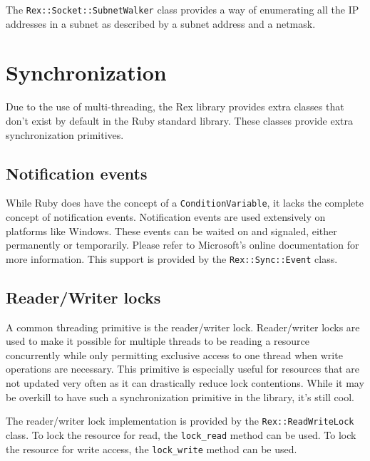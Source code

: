 \documentclass{report}
\begin{document}
\par
The \texttt{Rex::Socket::SubnetWalker} class provides a way of
enumerating all the IP addresses in a subnet as described by a
subnet address and a netmask.

    \section{Synchronization}

\par
Due to the use of multi-threading, the Rex library provides extra
classes that don't exist by default in the Ruby standard library.
These classes provide extra synchronization primitives.

        \subsection{Notification events}

\par
While Ruby does have the concept of a \texttt{ConditionVariable}, it
lacks the complete concept of notification events.  Notification
events are used extensively on platforms like Windows.  These events
can be waited on and signaled, either permanently or temporarily.
Please refer to Microsoft's online documentation for more
information. This support is provided by the
\texttt{Rex::Sync::Event} class.

        \subsection{Reader/Writer locks}

\par
A common threading primitive is the reader/writer lock.
Reader/writer locks are used to make it possible for multiple
threads to be reading a resource concurrently while only permitting
exclusive access to one thread when write operations are necessary.
This primitive is especially useful for resources that are not
updated very often as it can drastically reduce lock contentions.
While it may be overkill to have such a synchronization primitive in
the library, it's still cool.

\par
The reader/writer lock implementation is provided by the
\texttt{Rex::ReadWriteLock} class.  To lock the resource for read,
the \texttt{lock\_read} method can be used.  To lock the resource
for write access, the \texttt{lock\_write} method can be used.
\end{document}
